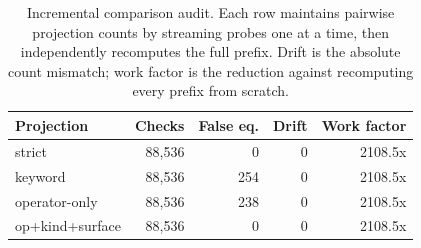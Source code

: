 \begin{table}[t]
\caption{Incremental comparison audit. Each row maintains pairwise projection counts by streaming probes one at a time, then independently recomputes the full prefix. Drift is the absolute count mismatch; work factor is the reduction against recomputing every prefix from scratch.}
\label{tab:incremental-audit}
\centering
\footnotesize
\begin{tabular}{lrrrr}
\toprule
Projection & Checks & False eq. & Drift & Work factor \\
\midrule
strict & 88,536 & 0 & 0 & 2108.5x \\
keyword & 88,536 & 254 & 0 & 2108.5x \\
operator-only & 88,536 & 238 & 0 & 2108.5x \\
op+kind+surface & 88,536 & 0 & 0 & 2108.5x \\
\bottomrule
\end{tabular}
\end{table}
